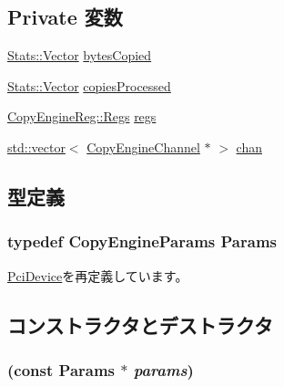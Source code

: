 \subsection*{Private 変数}
\begin{DoxyCompactItemize}
\item 
\hyperlink{classStats_1_1Vector}{Stats::Vector} \hyperlink{classCopyEngine_a25b7da20ae9cf014c7806abf1bf929b3}{bytesCopied}
\item 
\hyperlink{classStats_1_1Vector}{Stats::Vector} \hyperlink{classCopyEngine_a2c7c96445b0cb37f72b61dae4d2c541d}{copiesProcessed}
\item 
\hyperlink{structCopyEngineReg_1_1Regs}{CopyEngineReg::Regs} \hyperlink{classCopyEngine_ac3a32787c71b25fdee473de0804efa29}{regs}
\item 
\hyperlink{classstd_1_1vector}{std::vector}$<$ \hyperlink{classCopyEngine_1_1CopyEngineChannel}{CopyEngineChannel} $\ast$ $>$ \hyperlink{classCopyEngine_a2fa0132c83d16e1e404f54278dcf94c4}{chan}
\end{DoxyCompactItemize}


\subsection{型定義}
\hypertarget{classCopyEngine_a0b0580d58d6a0384646682653aefb97a}{
\subsubsection[{Params}]{\setlength{\rightskip}{0pt plus 5cm}typedef CopyEngineParams {\bf Params}}}
\label{classCopyEngine_a0b0580d58d6a0384646682653aefb97a}


\hyperlink{classPciDevice_aefbfd3f2d9daf3173b779eeff32e8112}{PciDevice}を再定義しています。

\subsection{コンストラクタとデストラクタ}
\hypertarget{classCopyEngine_a7042a20ebc60002d8be8c1dd2cc77d24}{
\subsubsection[{CopyEngine}]{ (const {\bf Params} $\ast$ {\em params})}}
\label{classCopyEngine_a7042a20ebc60002d8be8c1dd2cc77d24}



